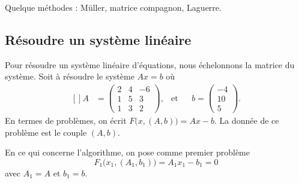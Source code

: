 Quelque méthodes : Müller, matrice compagnon, Laguerre.

\subsection{Résoudre un système linéaire}

Pour résoudre un système linéaire d'équations, nous échelonnons la matrice du système. Soit à résoudre le système $Ax=b$ où
\begin{equation}
	\begin{aligned}[]
		A&=\begin{pmatrix}
			2   &   4   &   -6  \\
			1   &   5   &   3   \\
			1   &   3   &   2
		\end{pmatrix}, &\text{et}&&b=\begin{pmatrix}
			-4  \\
			10  \\
			5
		\end{pmatrix}.
	\end{aligned}
\end{equation}
En termes de problèmes, on écrit $F\big( x,(A,b) \big)=Ax-b$. La donnée de ce problème est le couple $(A,b)$.

En ce qui concerne l'algorithme, on pose comme premier problème
\begin{equation}
	F_1\big(x_1,(A_1,b_1)\big)=A_1x_1-b_1=0
\end{equation}
avec $A_1=A$ et $b_1=b$.

